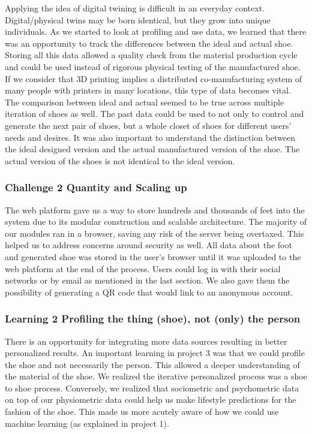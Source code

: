 Applying the idea of digital twining is difficult in an everyday context. Digital/physical twins may be born identical, but they grow into unique individuals. As we started to look at profiling and use data, we learned that there was an opportunity to track the differences between the ideal and actual shoe. Storing all this data allowed a quality check from the material production cycle and could be used instead of rigorous physical testing of the manufactured shoe. If we consider that 3D printing implies a distributed co-manufacturing \cite{Nachtigall2019} system of many people with printers in many locations, this type of data becomes vital. The comparison between ideal and actual seemed to be true across multiple iteration of shoes as well. The past data could be used to not only to control and generate the next pair of shoes, but a whole closet of shoes for different users' needs and desires. It was also important to understand the distinction between the ideal designed version and the actual manufactured version of the shoe. The actual version of the shoes is not identical to the ideal version.  

\subsubsection{Challenge 2 Quantity and Scaling up}

The web platform gave us a way to store hundreds and thousands of feet into the system due to its modular construction and scalable architecture. The majority of our modules ran in a browser, saving any risk of the server being overtaxed. This helped us to address concerns around security as well. All data about the foot and generated shoe was stored in the user's browser until it was uploaded to the web platform at the end of the process. Users could log in with their social networks or by email as mentioned in the last section. We also gave them the possibility of generating a QR code that would link to an anonymous account.

\subsubsection{Learning 2 Profiling the thing (shoe), not (only) the person}

There is an opportunity for integrating more data sources resulting in better personalized results. An important learning in project 3 was that we could profile the shoe and not necessarily the person. This allowed a deeper understanding of the material of the shoe. We realized the iterative personalized process was a shoe to shoe process. Conversely, we realized that sociometric and psychometric data on top of our physiometric data could help us make lifestyle predictions for the fashion of the shoe. This made us more acutely aware of how we could use machine learning (as explained in project 1). 

